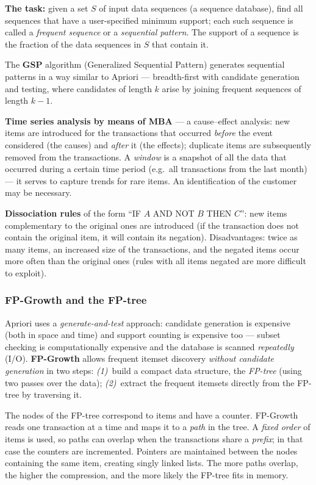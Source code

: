 \documentclass[11pt,a4paper]{article}
\theoremstyle{definition}
\providecommand{\uv}[1]{``#1''}
\begin{document}
\textbf{The task:} given a set $S$ of input data sequences (a sequence database), find all
sequences that have a user-specified minimum support; each such sequence is called a
\emph{frequent sequence} or a \emph{sequential pattern}. The support of a sequence is the
fraction of the data sequences in $S$ that contain it.

The \textbf{GSP} algorithm (Generalized Sequential Pattern) generates sequential patterns in a way
similar to Apriori --- breadth-first with candidate generation and testing, where candidates of
length $k$ arise by joining frequent sequences of length $k-1$.

\textbf{Time series analysis by means of MBA} --- a cause--effect analysis: new items are
introduced for the transactions that occurred \emph{before} the event considered (the causes) and
\emph{after} it (the effects); duplicate items are subsequently removed from the transactions. A
\emph{window} is a snapshot of all the data that occurred during a certain time period (e.g.\ all
transactions from the last month) --- it serves to capture trends for rare items. An
identification of the customer may be necessary.

\textbf{Dissociation rules} of the form \uv{IF $A$ AND NOT $B$ THEN $C$}: new items
complementary to the original ones are introduced (if the transaction does not contain the
original item, it will contain its negation). Disadvantages: twice as many items, an increased
size of the transactions, and the negated items occur more often than the original ones (rules
with all items negated are more difficult to exploit).

\subsubsection{FP-Growth and the FP-tree}

Apriori uses a \emph{generate-and-test} approach: candidate generation is expensive (both in
space and time) and support counting is expensive too --- subset checking is computationally
expensive and the database is scanned \emph{repeatedly} (I/O). \textbf{FP-Growth} allows frequent
itemset discovery \emph{without candidate generation} in two steps: \emph{(1)}~build a compact
data structure, the \emph{FP-tree} (using two passes over the data); \emph{(2)}~extract the
frequent itemsets directly from the FP-tree by traversing it.

\begin{defbox}
The nodes of the FP-tree correspond to items and have a counter. FP-Growth reads one transaction
at a time and maps it to a \emph{path} in the tree. A \emph{fixed order} of items is used, so
paths can overlap when the transactions share a \emph{prefix}; in that case the counters are
incremented. Pointers are maintained between the nodes containing the same item, creating singly
linked lists. The more paths overlap, the higher the compression, and the more likely the FP-tree
fits in memory.
\end{defbox}
\end{document}
